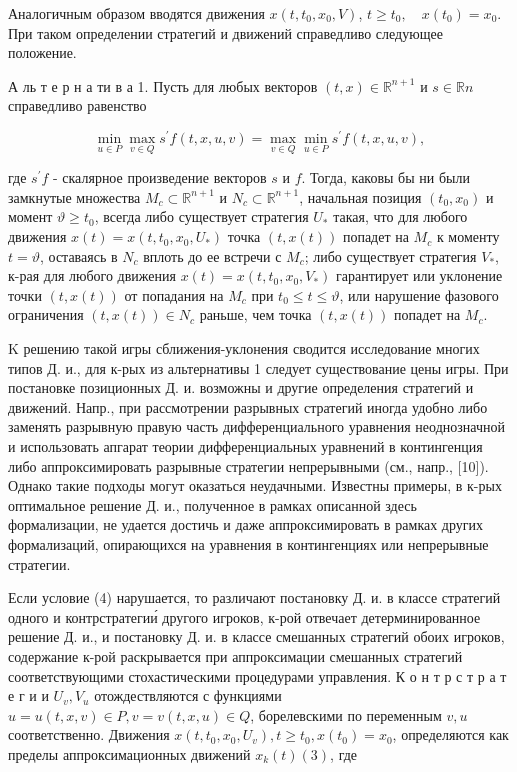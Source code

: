 \documentclass[10pt]{article}
\begin{document}
Аналогичным образом вводятся движения $x\left(t, t_{0}, x_{0}, V\right)$, $t \geqslant t_{0}, \quad x\left(t_{0}\right)=x_{0}$. При таком определении стратегий и движений справедливо следующее положение.



А ль т е р н а ти в а 1. Пусть для любых векторов $(t, x) \in \mathbb{R}^{n+1}$ и $s \in \mathbb{R} n$ справедливо равенство



\[

\min _{u \in P} \max _{v \in Q} s^{\prime} f(t, x, u, v)=\max _{v \in Q} \min _{u \in P} s^{\prime} f(t, x, u, v),

\]



где $s^{\prime} f$ - скалярное произведение векторов $s$ и $f$. Тогда, каковы бы ни были замкнутые множества $M_{c} \subset \mathbb{R}^{n+1}$ и $N_{c} \subset \mathbb{R}^{n+1}$, начальная позиция $\left(t_{0}, x_{0}\right)$ и момент $\vartheta \geqslant t_{0}$, всегда либо существует стратегия $U_{*}$ такая, что для любого движения $x(t)=x\left(t, t_{0}, x_{0}, U_{*}\right)$ точка $(t, x(t))$ попадет на $M_{c}$ к моменту $t=\vartheta$, оставаясь в $N_{c}$ вплоть до ее встречи с $M_{c}$; либо существует стратегия $V_{*}$, к-рая для любого движения $x(t)=x\left(t, t_{0}, x_{0}, V_{*}\right)$ гарантирует или уклонение точки $(t, x(t))$ от попадания на $M_{c}$ при $t_{0} \leqslant t \leqslant \vartheta$, или нарушение фазового ограничения $(t, x(t)) \in N_{c}$ раньше, чем точка $(t, x(t))$ попадет на $M_{c}$.



$\mathrm{K}$ решению такой игры сближения-уклонения сводится исследование многих типов Д. и., для к-рых из альтернативы 1 следует существование цены игры. При постановке позиционных Д. и. возможны и другие определения стратегий и движений. Напр., при рассмотрении разрывных стратегий иногда удобно либо заменять разрывную правую часть дифференциального уравнения неоднозначной и использовать апгарат теории дифференциальных уравнений в контингенция либо аппроксимировать разрывные стратегии непрерывными (см., напр., [10]). Однако такие подходы могут оказаться неудачными. Известны примеры, в к-рых оптимальное решение Д. и., полученное в рамках описанной здесь формализации, не удается достичь и даже аппроксимировать в рамках других формализаций, опирающихся на уравнения в контингенциях или непрерывные стратегии.



Если условие (4) нарушается, то различают постановку Д. и. в классе стратегий одного и контрстратегии́ другого игроков, к-рой отвечает детерминированное решение Д. и., и постановку Д. и. в классе смешанных стратегий обоих игроков, содержание к-рой раскрывается при аппроксимации смешанных стратегий соответствующими стохастическими процедурами управления. К о н т р с т р а т е г и и $U_{v}, V_{u}$ отождествляются с функциями $u=u(t, x, v) \in P, v=v(t, x, u) \in Q$, борелевскими по переменным $v, u$ соответственно. Движения $x\left(t, t_{0}, x_{0}, U_{v}\right), t \geqslant t_{0}, x\left(t_{0}\right)=x_{0}$, определяются как пределы аппроксимационных движений $x_{k}(t)(3)$, где
\end{document}
